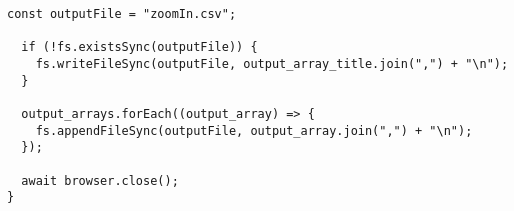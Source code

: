 \begin{lstlisting}[caption={PuppeteerとResource Timing APIを用いたズーム時の画像の読み込み時間の計測},label={lst:PuppeteerとResource Timing APIを用いたズーム時の画像の読み込み時間の計測}]
  const outputFile = "zoomIn.csv";

  if (!fs.existsSync(outputFile)) {
    fs.writeFileSync(outputFile, output_array_title.join(",") + "\n");
  }

  output_arrays.forEach((output_array) => {
    fs.appendFileSync(outputFile, output_array.join(",") + "\n");
  });

  await browser.close();
}

\end{lstlisting}